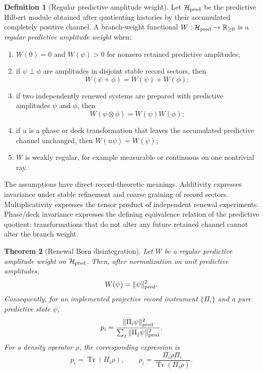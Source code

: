 \documentclass[11pt]{article}
\numberwithin{equation}{section}
\newtheorem{theorem}{Theorem}[section]
\theoremstyle{definition}
\newtheorem{definition}[theorem]{Definition}
\theoremstyle{remark}
\newcommand{\R}{\mathbb R}
\newcommand{\Hilb}{\mathcal H}
\newcommand{\Tr}{\operatorname{Tr}}
\begin{document}
\begin{definition}[Regular predictive amplitude weight]
\label{def:regular-weight}
Let \(\Hilb_{\rm pred}\) be the predictive Hilbert module obtained after quotienting histories by their accumulated completely positive channel.  A branch-weight functional \(W:\Hilb_{\rm pred}\to\R_{\ge0}\) is a \emph{regular predictive amplitude weight} when:
\begin{enumerate}[label=\textup{(\roman*)},leftmargin=2.2em]
\item \(W(0)=0\) and \(W(\psi)>0\) for nonzero retained predictive amplitudes;
\item if \(\psi\perp\phi\) are amplitudes in disjoint stable record sectors, then
\begin{equation}
\label{eq:weight-additivity}
  W(\psi+\phi)=W(\psi)+W(\phi);
\end{equation}
\item if two independently renewed systems are prepared with predictive amplitudes \(\psi\) and \(\phi\), then
\begin{equation}
\label{eq:weight-multiplicativity}
  W(\psi\otimes\phi)=W(\psi)W(\phi);
\end{equation}
\item if \(u\) is a phase or deck transformation that leaves the accumulated predictive channel unchanged, then \(W(u\psi)=W(\psi)\);
\item \(W\) is weakly regular, for example measurable or continuous on one nontrivial ray.
\end{enumerate}
\end{definition}

The assumptions have direct record-theoretic meanings.  Additivity expresses invariance under stable refinement and coarse graining of record sectors.  Multiplicativity expresses the tensor product of independent renewal experiments.  Phase/deck invariance expresses the defining equivalence relation of the predictive quotient: transformations that do not alter any future retained channel cannot alter the branch weight.

\begin{theorem}[Renewal Born disintegration]
\label{thm:renewal-born-disintegration}
Let \(W\) be a regular predictive amplitude weight on \(\Hilb_{\rm pred}\).  Then, after normalization on unit predictive amplitudes,
\begin{equation}
\label{eq:quadratic-weight}
  W(\psi)=\|\psi\|_{\rm pred}^{2}.
\end{equation}
Consequently, for an implemented projective record instrument \(\{\Pi_i\}\) and a pure predictive state \(\psi\),
\begin{equation}
\label{eq:born-disintegration}
  p_i
  =
  \frac{\|\Pi_i\psi\|_{\rm pred}^{2}}
    {\sum_j\|\Pi_j\psi\|_{\rm pred}^{2}}.
\end{equation}
For a density operator \(\rho\), the corresponding expression is
\begin{equation}
\label{eq:density-born}
  p_i=\Tr(\Pi_i\rho),
  \qquad
  \rho_i=\frac{\Pi_i\rho\Pi_i}{\Tr(\Pi_i\rho)} .
\end{equation}
\end{theorem}
\end{document}
